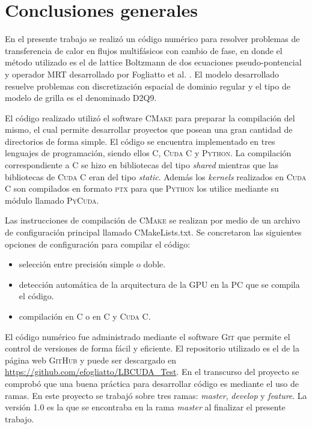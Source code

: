 \chapter{Conclusiones generales}
\graphicspath{{figs/cap4/}}
\label{cap5}

En el presente trabajo se realizó un código numérico para resolver problemas de transferencia de calor en flujos multifásicos con cambio de fase, en donde el método utilizado es el de lattice Boltzmann de dos ecuaciones pseudo-pontencial y operador MRT desarrollado por Fogliatto et al. \cite{fogliatto2019transferencia}. El modelo desarrollado resuelve problemas con discretización espacial de dominio regular y el tipo de modelo de grilla es el denominado D2Q9.

El código realizado utilizó el software \textsc{CMake} para preparar la compilación del mismo, el cual permite desarrollar proyectos que posean una gran cantidad de directorios de forma simple. El código se encuentra implementado en tres lenguajes de programación, siendo ellos \textsc{C}, \textsc{Cuda C} y \textsc{Python}. La compilación correspondiente a \textsc{C} se hizo en bibliotecas del tipo \textit{shared} mientras que las bibliotecas de \textsc{Cuda C} eran del tipo \textit{static}. Además los \textit{kernels} realizados en \textsc{Cuda C} son compilados en formato \textsc{ptx} para que \textsc{Python} los utilice mediante su módulo llamado \textsc{PyCuda}.

Las instrucciones de compilación de \textsc{CMake} se realizan por medio de un archivo de configuración principal llamado CMakeLists.txt. Se concretaron las siguientes opciones de configuración para compilar el código:

\begin{itemize}
	\item selección entre precisión simple o doble. 
	\item detección automática de la arquitectura de la GPU en la PC que se compila el código.
	\item compilación en \textsc{C} o en \textsc{C} y \textsc{Cuda C}.
\end{itemize}

El código numérico fue administrado mediante el software \textsc{Git} que permite el control de versiones de forma fácil y eficiente. El repositorio utilizado es el de la página web \textsc{GitHub} y puede ser descargado en \url{https://github.com/efogliatto/LBCUDA_Test}. En el transcurso del proyecto se comprobó que una buena práctica para desarrollar código es mediante el uso de ramas. En este proyecto se trabajó sobre tres ramas: \textit{master}, \textit{develop} y \textit{feature}. La versión 1.0 es la que se encontraba en la rama \textit{master} al finalizar el presente trabajo.

